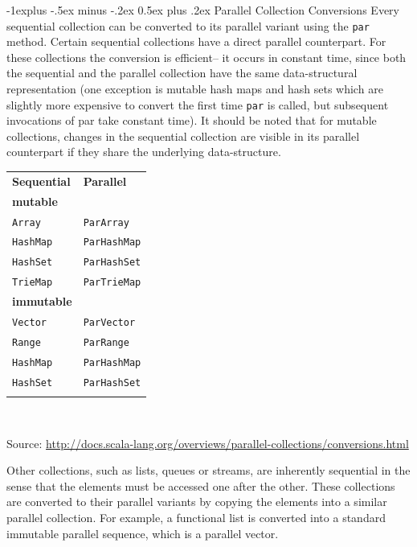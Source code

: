 \documentclass[a4paper,twoside,10pt,landscape]{article}
\makeatletter
\renewcommand{\subsection}{\@startsection{subsection}{2}{0mm}%
                                {-1explus -.5ex minus -.2ex}%
                                {0.5ex plus .2ex}%
                                {\normalfont\normalsize\bfseries}}
\makeatother
\begin{document}
\begin{multicols}{3}
\subsection{Parallel Collection Conversions}
Every sequential collection can be converted to its parallel variant using the \texttt{par} method. Certain sequential collections have a direct parallel counterpart. For these collections the conversion is efficient– it occurs in constant time, since both the sequential and the parallel collection have the same data-structural representation (one exception is mutable hash maps and hash sets which are slightly more expensive to convert the first time \texttt{par} is called, but subsequent invocations of par take constant time). It should be noted that for mutable collections, changes in the sequential collection are visible in its parallel counterpart if they share the underlying data-structure.

\begin{center}
\begin{tabular}{@{}ll@{}}
\hline\noalign{\smallskip}
\textbf{Sequential} & \textbf{Parallel} \\
\noalign{\smallskip}\hline\noalign{\smallskip}
\textbf{mutable} & \\
\texttt{Array} & \texttt{ParArray} \\
\texttt{HashMap} & \texttt{ParHashMap} \\
\texttt{HashSet} & \texttt{ParHashSet} \\
\texttt{TrieMap} & \texttt{ParTrieMap} \\
\textbf{immutable} & \\
\texttt{Vector} & \texttt{ParVector} \\
\texttt{Range} & \texttt{ParRange} \\
\texttt{HashMap} & \texttt{ParHashMap} \\
\texttt{HashSet} & \texttt{ParHashSet} \\
\noalign{\smallskip}\hline
\end{tabular} \\
\raggedright{\tiny{Source: \url{http://docs.scala-lang.org/overviews/parallel-collections/conversions.html}}}
\end{center}

Other collections, such as lists, queues or streams, are inherently sequential in the sense that the elements must be accessed one after the other. These collections are converted to their parallel variants by copying the elements into a similar parallel collection. For example, a functional list is converted into a standard immutable parallel sequence, which is a parallel vector.


\end{multicols}
\end{document}

